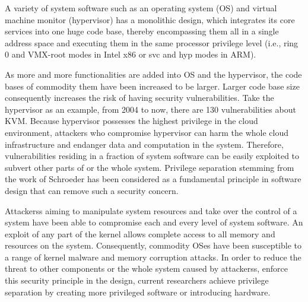 \documentclass[conference]{IEEEtran}
\begin{document}
A variety of system software such as an operating system (OS) and virtual machine monitor (hypervisor) has a monolithic design, which integrates its core services into one huge code base, thereby encompassing them all in a single address space and executing them in the same processor privilege level (i.e., ring 0 and VMX-root modes in Intel x86 or svc and hyp modes in ARM). 

As more and more functionalities are added into OS and the hypervisor, the code bases of commodity them have been increased to be larger. Larger code base  size consequently increases the risk of having security vulnerabilities. 
Take the hypervisor as an example, from 2004 to now, there are 130 vulnerabilities about KVM.
 Because hypervisor possesses the highest privilege in the cloud environment, attackers who compromise hypervisor can harm the whole cloud infrastructure and endanger data and computation in the system.
Therefore, vulnerabilities residing in a fraction of system software can be easily exploited to subvert other parts of or the whole system.
Privilege separation stemming from the work of Schroeder\cite{zhaobudao} has been considered as a fundamental principle in software design that can remove such a security concern.


Attackerss aiming to manipulate system resources and take over the control of a system have been able to compromise each and every level of system software. An exploit of any part of the kernel allows complete access to all memory and resources on the system. Consequently, commodity OSes have been susceptible to a range of kernel malware and memory corruption attacks.
In order to reduce the threat to other components or the whole system caused by attackerss, enforce this security principle in the design, current researchers achieve privilege separation by creating more privileged software or introducing hardware.
\end{document}
